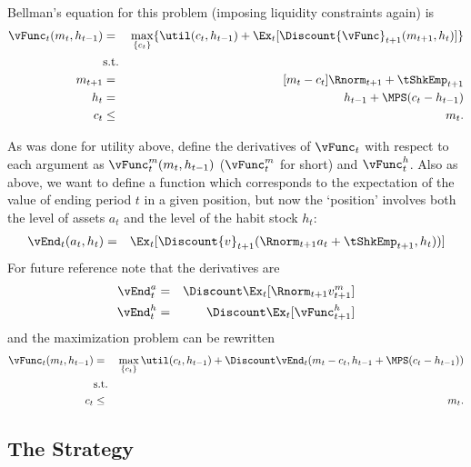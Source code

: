 \documentclass[titlepage]{\econtex}
\begin{document}
{  Bellman's equation for this problem (imposing liquidity constraints again) is
  \begin{eqnarray}
    {\vFunc}_{t}({m}_{t},h_{t-1}) & = & \max_{\{{c}_{t}\}}  \{\util({c}_{t},h_{t-1}) +
                                        \Ex_{t}[\Discount  {\vFunc}_{t+1}({m}_{t+1},h_{t}) ]\}
    \\ & \text{s.t.} & \nonumber \\
    {m}_{t+1} & = & [{m}_{t}-{c}_{t}]\Rnorm_{t+1} + \tShkEmp_{t+1}\\
    h_{t} &  = & h_{t-1} + \MPS ({c}_{t} - h_{t-1} ) \\
    {c}_{t} & \leq & {m}_{t} .
  \end{eqnarray}

  As was done for utility above, define the derivatives of ${\vFunc}_{t}$ with
  respect to each argument as ${\vFunc}_{t}^{m}({m}_{t},h_{t-1})$ (${\vFunc}_{t}^{m}$
  for short) and ${\vFunc}_{t}^{h}$.  Also as above, we want to
  define a function which corresponds to the expectation of the value of
  ending period $t$ in a given position, but now the `position'
  involves both the level of assets ${a}_{t}$ and the level of the habit
  stock $h_{t}$:
  \begin{eqnarray}
    \vEnd_{t}({a}_{t},h_{t}) & = & \Ex_{t}[\Discount {v}_{t+1}(\Rnorm_{t+1} {a}_{t}+{\tShkEmp}_{t+1},h_{t}))]
  \end{eqnarray}
  For future reference note that the derivatives are
  \begin{eqnarray}
    \vEnd_{t}^{{a}} & = & \Discount \Ex_{t} [\Rnorm_{t+1} {v}_{t+1}^{m}] \label{eq:vEndsdefn} \\
    \vEnd_{t}^{h} & = & \Discount \Ex_{t} [{\vFunc}_{t+1}^{h}] \label{eq:vEndhdefn}
  \end{eqnarray}
  and the maximization problem can be rewritten
  \begin{eqnarray}
    {\vFunc}_{t}({m}_{t},h_{t-1}) & = &
                                        \max_{\{{c}_{t}\}} %
                                        \util({c}_{t},h_{t-1})  +  \Discount
                                        \vEnd_{t}({m}_{t}-{c}_{t},h_{t-1}+\MPS({c}_{t}-h_{t-1}))
    \\        & \text{s.t.} & \nonumber
    \\  {c}_{t} & \leq & {m}_{t}.
  \end{eqnarray}

  \hypertarget{The-Strategy}{}
  \subsection{The Strategy}

}
\end{document}
